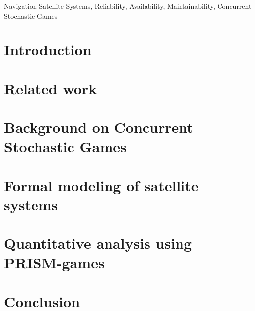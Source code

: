 \documentclass[conference]{IEEEtran}
\begin{document}
\begin{IEEEkeywords}
Navigation Satellite Systems, Reliability, Availability, Maintainability, Concurrent Stochastic Games
\end{IEEEkeywords}

\section{Introduction}

\begin{sloppypar}

\end{sloppypar}

\section{ Related work}
\label{sec:rw}
\begin{sloppypar}

\end{sloppypar}

\section{Background on Concurrent Stochastic  Games}
\label{Preliminaries}
\begin{sloppypar}

\end{sloppypar}

\section{Formal modeling of satellite systems}
\label{sattelitemodel}
\begin{sloppypar}

\end{sloppypar}

\section{Quantitative analysis using PRISM-games}\label{useCase}
\label{sec:useCase}
\begin{sloppypar}

\end{sloppypar}


\section{Conclusion}\label{conclusion}
\begin{sloppypar}

\end{sloppypar}


{\scriptsize
}
\end{document}
